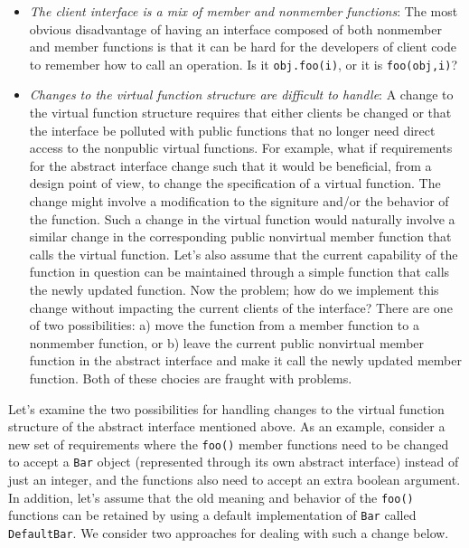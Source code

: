 \documentclass[pdf,ps2pdf,11pt]{SANDreport}
\begin{document}
\begin{itemize}

{}\item\textit{The client interface is a mix of member and nonmember
functions}: The most obvious disadvantage of having an interface composed of
both nonmember and member functions is that it can be hard for the developers
of client code to remember how to call an operation.  Is it
{}\texttt{obj.foo(i)}, or it is {}\texttt{foo(obj,i)}?

{}\item\textit{Changes to the virtual function structure are difficult to
handle}: A change to the virtual function structure requires that either
clients be changed or that the interface be polluted with public functions
that no longer need direct access to the nonpublic virtual functions.  For
example, what if requirements for the abstract interface change such that it
would be beneficial, from a design point of view, to change the specification
of a virtual function.  The change might involve a modification to the
signiture and/or the behavior of the function.  Such a change in the virtual
function would naturally involve a similar change in the corresponding public
nonvirtual member function that calls the virtual function.  Let's also assume
that the current capability of the function in question can be maintained
through a simple function that calls the newly updated function.  Now the
problem; how do we implement this change without impacting the current clients
of the interface?  There are one of two possibilities: a) move the function
from a member function to a nonmember function, or b) leave the current public
nonvirtual member function in the abstract interface and make it call the
newly updated member function.  Both of these chocies are fraught with
problems.

\end{itemize}

Let's examine the two possibilities for handling changes to the virtual
function structure of the abstract interface mentioned above.  As an example,
consider a new set of requirements where the {}\texttt{foo()} member functions
need to be changed to accept a {}\texttt{Bar} object (represented through its
own abstract interface) instead of just an integer, and the functions also
need to accept an extra boolean argument.  In addition, let's assume that the
old meaning and behavior of the {}\texttt{foo()} functions can be retained by
using a default implementation of {}\texttt{Bar} called {}\texttt{DefaultBar}.
We consider two approaches for dealing with such a change below.
\end{document}
